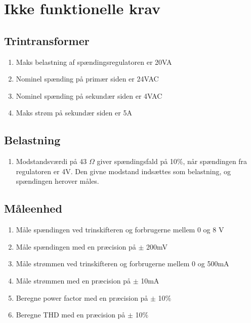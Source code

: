 
\section{Ikke funktionelle krav}

\subsection{Trintransformer}
\begin{enumerate}
	\item Maks belastning af spændingsregulatoren er 20VA
	\item Nominel spænding på primær siden er 24VAC
	\item Nominel spænding på sekundær siden er 4VAC
	\item Maks strøm på sekundær siden er 5A	
\end{enumerate}

\subsection{Belastning}
\begin{enumerate}
	\item Modstandsværdi på 43 $\Omega$ giver spændingsfald på 10\%, når spændingen fra regulatoren er 4V. Den givne modstand indsættes som belastning, og spændingen herover måles.
\end{enumerate}

\subsection{Måleenhed}
\begin{enumerate}
	\item Måle spændingen ved trinskifteren og forbrugerne mellem 0 og 8 V
	\item Måle spændingen med en præcision på $\pm$ 200mV
	\item Måle strømmen ved trinskifteren og forbrugerne mellem 0 og 500mA
	\item Måle strømmen med en præcision på $\pm$ 10mA 
	\item Beregne power factor med en præcision på $\pm$ 10$\%$
	\item Beregne THD med en præcision på $\pm$ 10$\%$
\end{enumerate}


